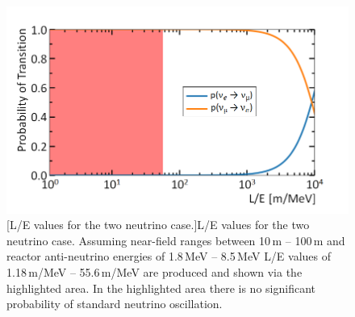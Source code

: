 \begin{figure}[!h]
  \centering
  \includegraphics[width=0.8\linewidth]{Chapter2/Figs/neutrinoLOverE_0-2000_ReactorRanges_10-8.5_100-1.8_Log_Adjusted_MedText.png}
  [L/E values for the two neutrino case.]{L/E values for the two neutrino case. Assuming near-field ranges between 10\,m -- 100\,m and reactor anti-neutrino energies of 1.8\,MeV -- 8.5\,MeV \cite{Mueller_2011} L/E values of 1.18\,m/MeV -- 55.6\,m/MeV are produced and shown via the highlighted area. In the highlighted area there is no significant probability of standard neutrino oscillation.}%
\label{fig:probabilityNeutrinoTransition}
\end{figure}



